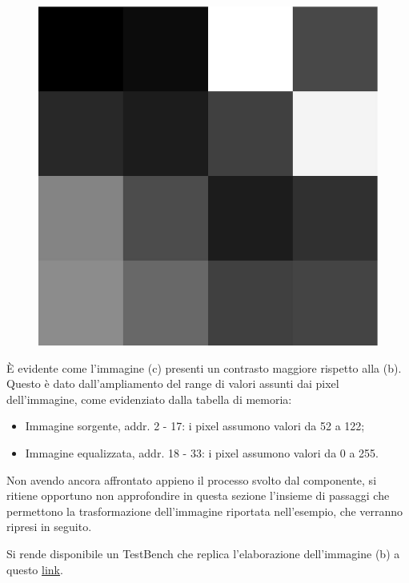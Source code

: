 \documentclass{article}
\begin{document}
\begin{figure}[ht]
\begin{minipage}[c]{.3\linewidth}
        \includegraphics[scale=0.25]{immElab.jpg}
        \label{esempio3}
    \end{minipage}
\end{figure}
\vspace{0.3cm}

È evidente come l'immagine \small (c) \normalsize presenti un contrasto maggiore rispetto alla \small(b)\normalsize. 
Questo è dato dall'ampliamento del range di valori assunti dai pixel dell'immagine, come evidenziato dalla tabella di memoria:
\begin{itemize}
    \item Immagine sorgente, addr. 2 - 17: i pixel assumono valori da 52 a 122;
    \item Immagine equalizzata, addr. 18 - 33: i pixel assumono valori da 0 a 255.
\end{itemize}

Non avendo ancora affrontato appieno il processo svolto dal componente, si ritiene opportuno non approfondire in questa sezione
l'insieme di passaggi che permettono la trasformazione dell'immagine riportata nell'esempio, che verranno ripresi in seguito. \par
Si rende disponibile un TestBench che replica l'elaborazione dell'immagine \small (b) \normalsize a questo \href{festadelsalame.com}{link}.
\vspace{1cm}
\end{document}
